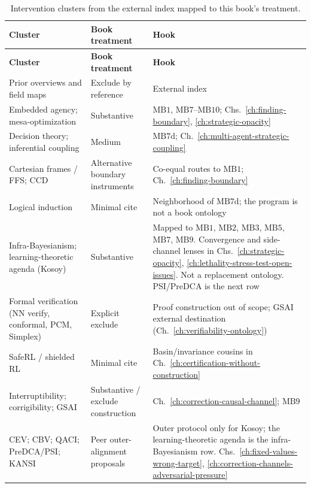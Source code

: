 \begin{longtable}{@{}p{}p{}p{}@{}}
\caption{Intervention clusters from the external index mapped to this book's treatment.}\label{tab:intervention-coverage}\\
\toprule
\textbf{Cluster} & \textbf{Book treatment} & \textbf{Hook} \\
\midrule
\endfirsthead
\toprule
\textbf{Cluster} & \textbf{Book treatment} & \textbf{Hook} \\
\midrule
\endhead
\bottomrule
\endfoot
Prior overviews and field maps & Exclude by reference & External index \autocite{zarncke2025interventions} \\
Embedded agency; mesa-optimization & Substantive & \(\text{MB1}\), \(\text{MB7}\)--\(\text{MB10}\); Chs.~\ref{ch:finding-boundary}, \ref{ch:strategic-opacity} \\
Decision theory; inferential coupling & Medium & \(\text{MB7d}\); Ch.~\ref{ch:multi-agent-strategic-coupling} \\
Cartesian frames / FFS; CCD & Alternative boundary instruments & Co-equal routes to \(\text{MB1}\); Ch.~\ref{ch:finding-boundary} \\
Logical induction & Minimal cite & Neighborhood of \(\text{MB7d}\); the program is not a book ontology \\
Infra-Bayesianism; learning-theoretic agenda (Kosoy) & Substantive & Mapped to \(\text{MB1}\), \(\text{MB2}\), \(\text{MB3}\), \(\text{MB5}\), \(\text{MB7}\), \(\text{MB9}\). Convergence and side-channel lenses \autocite{kosoy2026alignmentproblem} in Chs.~\ref{ch:strategic-opacity}, \ref{ch:lethality-stress-test-open-issues}. Not a replacement ontology. PSI/PreDCA is the next row \\
Formal verification (NN verify, conformal, PCM, Simplex) & Explicit exclude & Proof construction out of scope; GSAI external destination (Ch.~\ref{ch:verifiability-ontology}) \\
SafeRL / shielded RL & Minimal cite & Basin/invariance cousins in Ch.~\ref{ch:certification-without-construction} \\
Interruptibility; corrigibility; GSAI & Substantive / exclude construction & Ch.~\ref{ch:correction-causal-channel}; \(\text{MB9}\) \\
CEV; CBV; QACI; PreDCA/PSI; KANSI & Peer outer-alignment proposals & Outer protocol only for Kosoy; the learning-theoretic agenda is the infra-Bayesianism row. Chs.~\ref{ch:fixed-values-wrong-target}, \ref{ch:correction-channels-adversarial-pressure} \\

\end{longtable}
